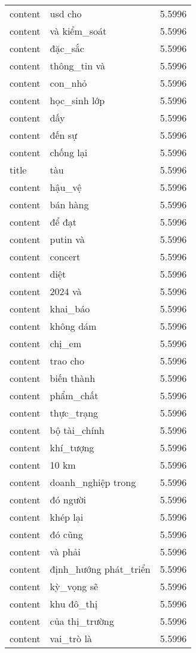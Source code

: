 \documentclass{article}
\begin{document}
\begin{tabular}{lll}
content & usd cho & 5.5996\\
content & và kiểm\_soát & 5.5996\\
content & đặc\_sắc & 5.5996\\
content & thông\_tin và & 5.5996\\
content & con\_nhỏ & 5.5996\\
content & học\_sinh lớp & 5.5996\\
content & dấy & 5.5996\\
content & đến sự & 5.5996\\
content & chống lại & 5.5996\\
title & tàu & 5.5996\\
content & hậu\_vệ & 5.5996\\
content & bán hàng & 5.5996\\
content & để đạt & 5.5996\\
content & putin và & 5.5996\\
content & concert & 5.5996\\
content & diệt & 5.5996\\
content & 2024 và & 5.5996\\
content & khai\_báo & 5.5996\\
content & không dám & 5.5996\\
content & chị\_em & 5.5996\\
content & trao cho & 5.5996\\
content & biến thành & 5.5996\\
content & phẩm\_chất & 5.5996\\
content & thực\_trạng & 5.5996\\
content & bộ tài\_chính & 5.5996\\
content & khí\_tượng & 5.5996\\
content & 10 km & 5.5996\\
content & doanh\_nghiệp trong & 5.5996\\
content & đó người & 5.5996\\
content & khép lại & 5.5996\\
content & đó cũng & 5.5996\\
content & và phải & 5.5996\\
content & định\_hướng phát\_triển & 5.5996\\
content & kỳ\_vọng sẽ & 5.5996\\
content & khu đô\_thị & 5.5996\\
content & của thị\_trường & 5.5996\\
content & vai\_trò là & 5.5996\\

\end{tabular}
\end{document}
